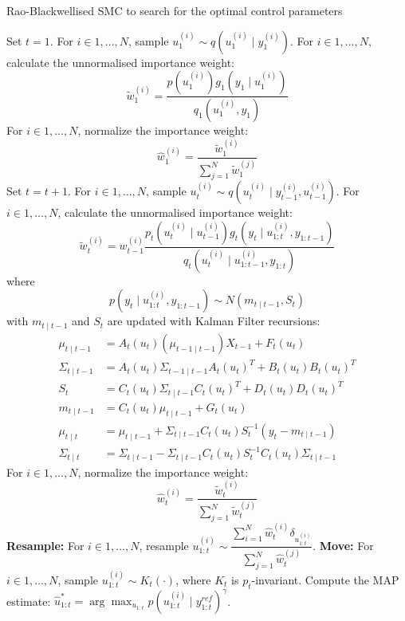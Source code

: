 \begin{algorithm}
\caption{Rao-Blackwellised SMC to search for the optimal control parameters}\label{algo:msmc}
\begin{algorithmic}[1]
\State Set $t = 1$.
\State For $i \in 1, \ldots, N$, sample $u^{(i)}_1 \sim q(u^{(i)}_1 \mid y^{(i)}_1)$.
\State For $i \in 1, \ldots, N$, calculate the unnormalised importance weight:
\begin{equation*}
 \tilde{w}^{(i)}_1 = \dfrac{p(u_1^{(i)})g_1(y_1 \mid u^{(i)}_1)}{q_1(u^{(i)}_1, y_1)}
\end{equation*}
\State For $i \in 1, \ldots, N$, normalize the importance weight:
\begin{equation*}
\hat{w}^{(i)}_1 = \dfrac{\tilde{w}^{(i)}_1}{\sum^N_{j=1} \tilde{w}^{(j)}_1}
\end{equation*}
\State Set $t = t + 1$.
\State For $i \in 1, \ldots, N$, sample $u^{(i)}_t \sim q(u^{(i)}_t \mid y^{(i)}_{t-1}, u^{(i)}_{t-1})$.
\State For $i \in 1, \ldots, N$, calculate the unnormalised importance weight:
\begin{equation*}
   \tilde{w}^{(i)}_t = w^{(i)}_{t-1} \dfrac{p_t(u^{(i)}_t \mid u^{(i)}_{t-1})g_t(y_t \mid u^{(i)}_{1:t}, y_{1:t-1})}{q_t(u^{(i)}_t \mid u^{(i)}_{1:t-1}, y_{1:t})}
\end{equation*}
where
\begin{equation}
  p(y_t \mid u^{(i)}_{1:t}, y_{1:t-1}) \sim N(m_{t \mid t-1},S_t)
\end{equation}
with $m_{t \mid t-1}$ and $S_t$ are updated with Kalman Filter recursions:
\begin{align}
  \mu_{t \mid t -1} &= A_{t}(u_t)(\mu_{t-1 \mid t-1})X_{t-1} + F_t(u_t) \nonumber \\
  \Sigma_{t \mid t -1} &= A_{t}(u_t)\Sigma_{t -1 \mid t -1}A_{t}(u_t)^T +  B_t(u_t)B_t(u_t)^T \nonumber\\
  S_t &=  C_{t}(u_t)\Sigma_{t \mid t -1}C_{t}(u_t)^T +  D_t(u_t)D_t(u_t)^T \nonumber\\
  m_{t \mid t-1} &=  C_{t}(u_t)  \mu_{t \mid t-1} + G_t(u_t) \nonumber\\
  \mu_{t \mid t} &=   \mu_{t \mid t -1} +   \Sigma_{t \mid t -1} C_{t}(u_t)S_t^{-1}(y_t - m_{t \mid t-1}) \nonumber\\
  \Sigma_{t \mid t} &=  \Sigma_{t \mid t -1} -\Sigma_{t \mid t -1} C_{t}(u_t)S_t^{-1} C_{t}(u_t)\Sigma_{t \nonumber \mid t -1}
\end{align}
\State For $i \in 1, \ldots, N$, normalize the importance weight:
\begin{equation*}
\hat{w}^{(i)}_t = \dfrac{\tilde{w}^{(i)}_t}{\sum^N_{j=1} \tilde{w}^{(j)}_t}
\end{equation*}
\State \textbf{Resample:} For $i \in 1, \ldots, N$, resample $ u^{(i)}_{1:t} \sim \dfrac{\sum^N_{i=1}\hat{w}^{(i)}_t\delta_{u^{(i)}_{1:t}}}{\sum^N_{j=1} \hat{w}^{(j)}_t}$.
\State \textbf{Move:} For $i \in 1, \ldots, N$, sample $u^{(i)}_{1:t} \sim K_t(\cdot)$, where $K_t$ is $p_t$-invariant.
\EndWhile
\State Compute the MAP estimate: $\hat{u}^*_{1:t} =  \arg\max_{u_{1:t}} p(u^{(i)}_{1:t} \mid y^{ref}_{1:t})^\gamma$.
\EndFunction
\end{algorithmic}
\end{algorithm}

